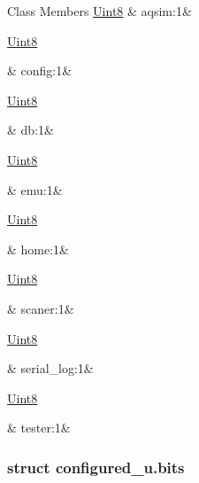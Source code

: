 \begin{DoxyFields}{Class Members}
\hypertarget{a00001_afc71f02b70f92f592414409d16d2c4d5}{\hyperlink{a00001_a979e3e23b9a449e69ab6a8a83b6042f8}{Uint8}}\label{a00001_afc71f02b70f92f592414409d16d2c4d5}
&
aqsim\+:1&
\\
\hline

\hypertarget{a00001_a2245023265ae4cf87d02c8b6ba991139}{\hyperlink{a00001_a979e3e23b9a449e69ab6a8a83b6042f8}{Uint8}}\label{a00001_a2245023265ae4cf87d02c8b6ba991139}
&
config\+:1&
\\
\hline

\hypertarget{a00001_ad77d5e503ad1439f585ac494268b351b}{\hyperlink{a00001_a979e3e23b9a449e69ab6a8a83b6042f8}{Uint8}}\label{a00001_ad77d5e503ad1439f585ac494268b351b}
&
db\+:1&
\\
\hline

\hypertarget{a00001_a65d15fe9156f9c4bbffd98085992a44e}{\hyperlink{a00001_a979e3e23b9a449e69ab6a8a83b6042f8}{Uint8}}\label{a00001_a65d15fe9156f9c4bbffd98085992a44e}
&
emu\+:1&
\\
\hline

\hypertarget{a00001_a106a6c241b8797f52e1e77317b96a201}{\hyperlink{a00001_a979e3e23b9a449e69ab6a8a83b6042f8}{Uint8}}\label{a00001_a106a6c241b8797f52e1e77317b96a201}
&
home\+:1&
\\
\hline

\hypertarget{a00001_a67207cf753073ae886b39ab3fc5c4d01}{\hyperlink{a00001_a979e3e23b9a449e69ab6a8a83b6042f8}{Uint8}}\label{a00001_a67207cf753073ae886b39ab3fc5c4d01}
&
scaner\+:1&
\\
\hline

\hypertarget{a00001_afb0e9cfed573af3386c32c1abbcba5e1}{\hyperlink{a00001_a979e3e23b9a449e69ab6a8a83b6042f8}{Uint8}}\label{a00001_afb0e9cfed573af3386c32c1abbcba5e1}
&
serial\+\_\+log\+:1&
\\
\hline

\hypertarget{a00001_af5d1278e8109edd94e1e4197e04873b9}{\hyperlink{a00001_a979e3e23b9a449e69ab6a8a83b6042f8}{Uint8}}\label{a00001_af5d1278e8109edd94e1e4197e04873b9}
&
tester\+:1&
\\
\hline

\end{DoxyFields}
\label{d1/d6f/a00063}
\hypertarget{a00001_d1/d6f/a00063}{}
\subsubsection{struct configured\+\_\+u.\+bits}


